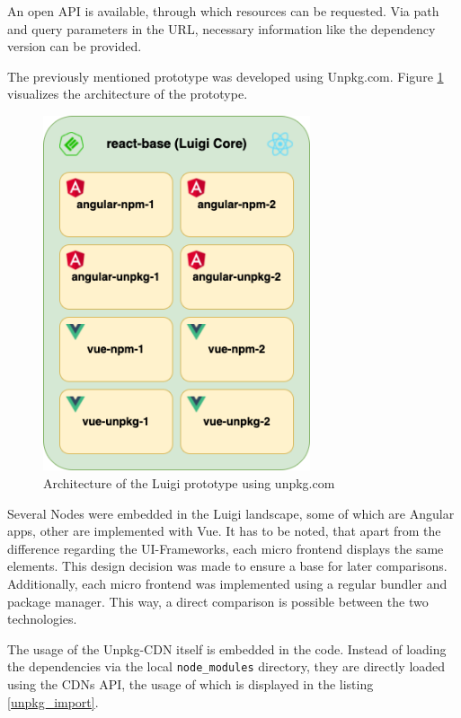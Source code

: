 An open API is available, through which resources can be requested. Via path and query parameters in the URL, necessary information like the dependency version can be provided.

The previously mentioned prototype was developed using Unpkg.com. Figure \ref{fig:unpkg_prototype_architecture} visualizes the architecture of the prototype.

\begin{figure}[!h]
	\centering
	\includegraphics[width=0.7\textwidth]{Figures/unpkg.architecture.drawio.png}
	\caption{Architecture of the Luigi prototype using unpkg.com}
	\label{fig:unpkg_prototype_architecture}
\end{figure}
\newpage
Several Nodes were embedded in the Luigi landscape, some of which are Angular apps, other are implemented with Vue. It has to be noted, that apart from the difference regarding the UI-Frameworks, each micro frontend displays the same elements. This design decision was made to ensure a base for later comparisons. Additionally, each micro frontend was implemented using a regular bundler and package manager. This way, a direct comparison is possible between the two technologies.

The usage of the Unpkg-CDN itself is embedded in the code. Instead of loading the dependencies via the local \texttt{node\_modules} directory, they are directly loaded using the CDNs API, the usage of which is displayed in the listing \ref{unpkg_import}.

